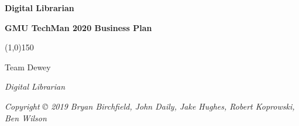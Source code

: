 \documentclass[9pt,]{book}
\begin{document}
  \sloppy %
  \setcounter{page}{1}
  \pagestyle{empty}
  \begin{center}
    \vspace*{\fill}

    \LARGE\textbf{\textsf{Digital Librarian}}

    \vspace*{\fill}
    \vspace*{\fill}
  \end{center}
  \clearpage

  \newpage
  \emph{ }\newline
    \clearpage

  \begin{center}
    \vspace*{\fill}

    \ttfamily{\Huge\color{blue}{Digital Librarian}}

        \vspace*{0.125in}
    {\centering
     \Large\textbf{\textsf{GMU TechMan 2020 Business Plan}}
    }


    
    \vspace*{0.25in}
    \line(1,0){150}
    \vspace*{0.25in}

    \Large\textsf{Team Dewey}

    \vspace*{\fill}
    \vspace*{\fill}
      \end{center}
  \clearpage

  \vspace*{\fill}

  \par\noindent\emph{Digital Librarian}\newline
  \par\noindent\emph{Copyright © 2019 Bryan Birchfield, John Daily, Jake Hughes, Robert
Koprowski, Ben Wilson}\newline
\end{document}
